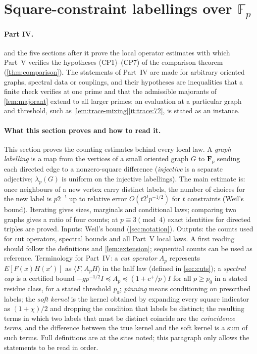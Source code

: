 
\section{Square-constraint labellings over \texorpdfstring{$\mathbb F_p$}{Fp}}
\label{sec:labellings}

\paragraph{Part IV.}
 and the five sections after it prove the local
operator estimates with which Part~V verifies the hypotheses (CP1)--(CP7) of
the comparison theorem (\cref{thm:comparison}). The statements of Part~IV
are made for arbitrary oriented graphs, spectral data or couplings, and their
hypotheses are inequalities that a finite check verifies at one prime and that
the admissible majorants of \cref{lem:majorant} extend to all larger primes;
an evaluation at a particular graph and threshold, such as
\cref{lem:trace-mixing}\ref{it:trace:72}, is stated as an instance.

\paragraph{What this section proves and how to read it.}
This section proves the counting estimates behind every local law.
A \emph{graph labelling} is a map from the vertices of a small
oriented graph $G$ to $\mathbf F_p$ sending each directed edge to a
nonzero-square difference (\emph{injective} is a separate adjective;
$\lambda_p(G)$ is uniform on the injective labellings). The main
estimate is: once neighbours of a new vertex carry distinct labels,
the number of choices for the new label is $p2^{-t}$ up to relative
error $O(t2^tp^{-1/2})$ for $t$ constraints (Weil's bound).
Iterating gives sizes, marginals and conditional laws; comparing two
graphs gives a ratio of four counts; at $p\equiv3\pmod4$ exact
identities for directed triples are proved. Inputs: Weil's bound
(\cref{sec:notation}). Outputs: the counts used for cut operators,
spectral bounds and all Part~V local laws. A first reading should
follow the definitions and \cref{lem:extension}; sequential counts
can be used as reference. Terminology for Part~IV: a \emph{cut
operator} $A_p$ represents $E[F(x)H(x')]$ as
$\langle F,A_pH\rangle$ in the half law (defined in
\cref{sec:cuts}); a \emph{spectral cap} is a certified bound
$-gp^{-1/2}I\preceq A_p\preceq(1+c^+/p)I$ for all $p\ge p_0$ in a
stated residue class, for a stated threshold $p_0$;
\emph{pinning} means conditioning on prescribed labels; the
\emph{soft kernel} is the kernel obtained by expanding every
square indicator as $(1+\chi)/2$ and dropping the condition that
labels be distinct; the resulting terms in which two labels that
must be distinct coincide are the \emph{coincidence terms}, and
the difference between the true kernel and the soft kernel is a
sum of such terms. Full definitions are at the sites
noted; this paragraph only allows the statements to be read in order.

